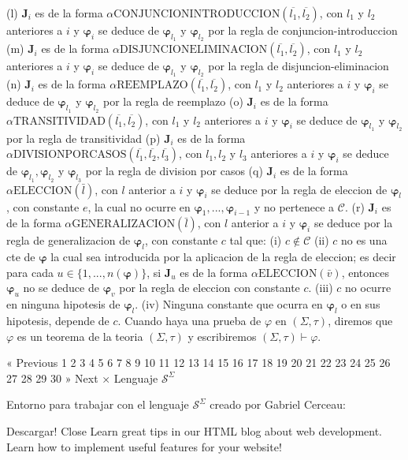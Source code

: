 (l) \(\mathbf{J}_{i}\) es de la forma \(\alpha \mathrm{ CONJUNCIONINTRODUCCION}(\overline{l_{1}},\overline{l_{2}})\), con \(l_{1}\) y \( l_{2}\) anteriores a \(i\) y \(\mathbf{\varphi }_{i}\) se deduce de \(\mathbf{ \varphi }_{l_{1}}\) y \(\mathbf{\varphi }_{l_{2}}\) por la regla de conjuncion-introduccion
(m) \(\mathbf{J}_{i}\) es de la forma \(\alpha \mathrm{ DISJUNCIONELIMINACION}(\overline{l_{1}},\overline{l_{2}})\), con \(l_{1}\) y \( l_{2}\) anteriores a \(i\) y \(\mathbf{\varphi }_{i}\) se deduce de \(\mathbf{ \varphi }_{l_{1}}\) y \(\mathbf{\varphi }_{l_{2}}\) por la regla de disjuncion-eliminacion
(n) \(\mathbf{J}_{i}\) es de la forma \(\alpha \mathrm{REEMPLAZO}( \overline{l_{1}},\overline{l_{2}})\), con \(l_{1}\) y \(l_{2}\) anteriores a \(i\) y \(\mathbf{\varphi }_{i}\) se deduce de \(\mathbf{\varphi }_{l_{1}}\) y \( \mathbf{\varphi }_{l_{2}}\) por la regla de reemplazo
(o) \(\mathbf{J}_{i}\) es de la forma \(\alpha \mathrm{TRANSITIVIDAD}( \overline{l_{1}},\overline{l_{2}})\), con \(l_{1}\) y \(l_{2}\) anteriores a \(i\) y \(\mathbf{\varphi }_{i}\) se deduce de \(\mathbf{\varphi }_{l_{1}}\) y \( \mathbf{\varphi }_{l_{2}}\) por la regla de transitividad
(p) \(\mathbf{J}_{i}\) es de la forma \(\alpha \mathrm{DIVISIONPORCASOS}( \overline{l_{1}},\overline{l_{2}},\overline{l_{3}})\), con \(l_{1},l_{2}\) y \( l_{3}\) anteriores a \(i\) y \(\mathbf{\varphi }_{i}\) se deduce de \(\mathbf{ \varphi }_{l_{1}},\mathbf{\varphi }_{l_{2}}\) y \(\mathbf{\varphi }_{l_{3}}\) por la regla de division por casos
(q) \(\mathbf{J}_{i}\) es de la forma \(\alpha \mathrm{ELECCION}(\bar{l} ) \), con \(l\) anterior a \(i\) y \(\mathbf{\varphi }_{i}\) se deduce por la regla de eleccion de \(\mathbf{\varphi }_{l}\), con constante \(e\), la cual no ocurre en \(\mathbf{\varphi }_{1},...,\mathbf{\varphi }_{i-1}\) y no pertenece a \( \mathcal{C}\).
(r) \(\mathbf{J}_{i}\) es de la forma \(\alpha \mathrm{GENERALIZACION}( \bar{l})\), con \(l\) anterior a \(i\) y \(\mathbf{\varphi }_{i}\) se deduce por la regla de generalizacion de \(\mathbf{\varphi }_{l}\), con constante \(c\) tal que:
(i) \(c\not\in \mathcal{C}\)
(ii) \(c\) no es una cte de \(\mathbf{\varphi }\) la cual sea introducida por la aplicacion de la regla de eleccion; es decir para cada \(u\in \{1,...,n(\mathbf{\varphi })\}\), si \(\mathbf{J}_{u}\) es de la forma \(\alpha \mathrm{ELECCION}(\bar{v})\), entonces \(\mathbf{\varphi }_{u}\) no se deduce de \(\mathbf{\varphi }_{v}\) por la regla de eleccion con constante \(c\).
(iii) \(c\) no ocurre en ninguna hipotesis de \(\mathbf{\varphi }_{l}.\)
(iv) Ninguna constante que ocurra en \(\mathbf{\varphi }_{l}\) o en sus hipotesis, depende de \(c.\)
Cuando haya una prueba de \(\varphi \) en \((\Sigma ,\tau )\), diremos que \( \varphi \) es un teorema de la teoria \((\Sigma ,\tau )\) y escribiremos \((\Sigma ,\tau )\vdash \varphi .\)

« Previous
1
2
3
4
5
6
7
8
9
10
11
12
13
14
15
16
17
18
19
20
21
22
23
24
25
26
27
28
29
30
» Next
×
Lenguaje \(\mathcal{S}^{\Sigma }\)

Entorno para trabajar con el lenguaje \(\mathcal{S}^{\Sigma }\) creado por Gabriel Cerceau:

Descargar!
Close
Learn great tips in our HTML blog about web development. Learn how to implement useful features for your website!
